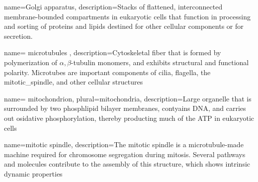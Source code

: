 

 {
	name={Golgi apparatus},
	description={Stacks of flattened, interconnected membrane-bounded compartments in eukaryotic cells that function in processing and sorting of proteins and lipids destined for other cellular components or for secretion.\cite{lodish2003molecular}}}



 {
	name= {microtubules} ,
	description={Cytoskeletal fiber that is formed by polymerization of $\alpha,\beta$-tubulin monomers, and exhibits structural and functional polarity. Microtubes are important components of cilia, flagella, the \gls{mitotic_spindle}, and other cellular structures\cite{lodish2003molecular}}}


 {
	name= {mitochondrion},
	plural={mitochondria},
	description={Large \gls{organelle} that is surrounded by two phosphlipid bilayer membranes, contyains DNA, and carries out osidative phosphorylation, thereby producting much of the \gls{ATP} in eukaryotic cells\cite{lodish2003molecular} }}


 {
	name={mitotic spindle},
	description={The mitotic spindle is a microtubule-made machine required for chromosome segregation during mitosis. Several pathways and molecules contribute to the assembly of this structure, which shows intrinsic dynamic properties\cite{bradshaw2015encyclopedia}}}

